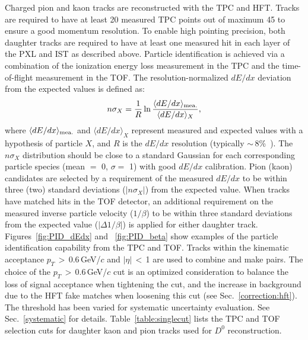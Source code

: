\documentclass[%
 reprint,	
showpacs,
 amsmath,amssymb,
 aps,
 prc,
]{revtex4-1}
\begin{document}
Charged pion and kaon tracks are reconstructed with the TPC and HFT. Tracks are required to have at least 20 measured TPC points out of maximum 45 to ensure a good momentum resolution. To enable high pointing precision, both daughter tracks are required to have at least one measured hit in each layer of the PXL and IST as described above. Particle identification is achieved via a combination of the ionization energy loss measurement in the TPC and the time-of-flight measurement in the TOF. The resolution-normalized $dE/dx$ deviation from the expected values is defined as:
\begin{equation}
  n\sigma_X = \frac{1}{R}\ln\frac{\langle{dE/dx}\rangle_{\rm {mea.}}}{\langle{dE/dx}\rangle_{X}},
\label{equ:equation1}
\end{equation}
where $\langle{dE/dx}\rangle_{\rm {mea.}}$ and $\langle{dE/dx}\rangle_{X}$ represent measured and expected values with a hypothesis of particle $X$, and $R$ is the $dE/dx$ resolution (typically $\sim$\,8\%~\cite{TPC}). The $n\sigma_X$ distribution should be close to a standard Gaussian for each corresponding particle species (mean $=$ 0, $\sigma = $ 1) with good $dE/dx$ calibration.
Pion (kaon) candidates are selected by a requirement of the measured $dE/dx$ to be within three (two) standard deviations ($|n\sigma_{X}|$) from the expected value. When tracks have matched hits in the TOF detector, an additional requirement on the measured inverse particle velocity ($1/\beta$) to be within three standard deviations from the expected value ($|\Delta 1/\beta|$) is applied for either daughter track. Figures~\ref{fig:PID_dEdx} and ~\ref{fig:PID_beta} show examples of the particle identification capability from the TPC and TOF. Tracks within the kinematic acceptance $p_{T}$\,$>$\,0.6\,GeV/$c$ and $|\eta|$\,$<$\,1 are used to combine and make pairs. The choice of the $p_T$\,$>$\,0.6\,GeV/$c$ cut is an optimized consideration to balance the loss of signal acceptance when tightening the cut, and the increase in background due to the HFT fake matches when loosening this cut (see Sec.~\ref{correction:hft}). The threshold has been varied for systematic uncertainty evaluation. See Sec.~\ref{systematic} for details. Table~\ref{table:singlecut} lists the TPC and TOF selection cuts for daughter kaon and pion tracks used for $D^0$ reconstruction.
\end{document}
